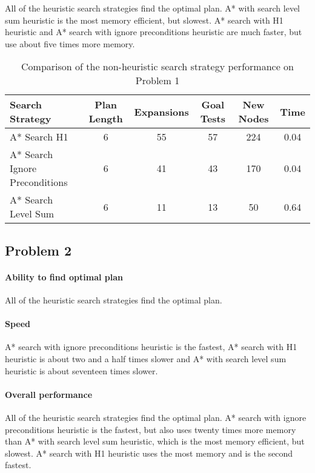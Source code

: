 \documentclass[11pt]{article}
\begin{document}
All of the heuristic search strategies find the optimal plan. A* with search level sum heuristic is the most memory efficient, but slowest. A* search with H1 heuristic and A* search with ignore preconditions heuristic are much faster, but use about five times more memory.

\begin{table}[H]
  \centering
  \caption{Comparison of the non-heuristic search strategy performance on Problem 1}
  \bigskip
  \label{table:hp1}
  \bgroup
  \def\arraystretch{1.5}
  \begin{tabular}{p{3.7cm}|c|c|c|c|c}
    Search Strategy & Plan Length & Expansions & Goal Tests & New Nodes & Time \\
    \hline
    A* Search H1 & 6 & 55 & 57 & 224 & 0.04 \\
    A* Search Ignore Preconditions & 6 & 41 & 43 & 170 & 0.04 \\
    A* Search Level Sum & 6 & 11 & 13 & 50 & 0.64 \\
  \end{tabular}
  \egroup
\end{table}


\subsection{Problem 2}

\paragraph{Ability to find optimal plan}

All of the heuristic search strategies find the optimal plan.

\paragraph{Speed}

A* search with ignore preconditions heuristic is the fastest, A* search with H1 heuristic is about two and a half times slower and A* with search level sum heuristic is about seventeen times slower.

\paragraph{Overall performance}

All of the heuristic search strategies find the optimal plan. A* search with ignore preconditions heuristic is the fastest, but also uses twenty times more memory than A* with search level sum heuristic, which is the most memory efficient, but slowest. A* search with H1 heuristic uses the most memory and is the second fastest.
\end{document}
